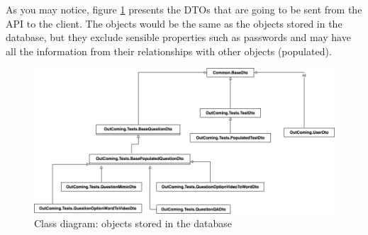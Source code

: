             As you may notice, figure \ref{fig:implementation_entities_db} presents the DTOs that are going to be sent from the API to the client. The objects would be
            the same as the objects stored in the database, but they exclude sensible properties such as passwords and may have all the information from their relationships
            with other objects (populated).
            \begin{figure}[H]
                \centering
                    \includegraphics[width=\textwidth]{assets/diagrams/outcoming_dto.png}
                \caption{Class diagram: objects stored in the database}
                \label{fig:implementation_entities_db}
            \end{figure}
        
            
        \newpage
